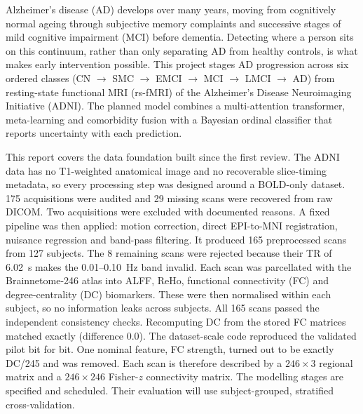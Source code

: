 \documentclass{ssnreview}
\begin{document}
\makereviewtitle
\reviewfrontmatter

\begin{reviewabstract}
Alzheimer's disease (AD) develops over many years, moving from cognitively
normal ageing through subjective memory complaints and successive stages of
mild cognitive impairment (MCI) before dementia. Detecting where a person sits
on this continuum, rather than only separating AD from healthy controls, is
what makes early intervention possible. This project stages AD progression
across six ordered classes (CN $\rightarrow$ SMC $\rightarrow$ EMCI
$\rightarrow$ MCI $\rightarrow$ LMCI $\rightarrow$ AD) from resting-state
functional MRI (rs-fMRI) of the Alzheimer's Disease Neuroimaging Initiative
(ADNI). The planned model combines a multi-attention transformer, meta-learning
and comorbidity fusion with a Bayesian ordinal classifier that reports
uncertainty with each prediction.

This report covers the data foundation built since the first review. The ADNI
data has no T1-weighted anatomical image and no recoverable slice-timing
metadata, so every processing step was designed around a BOLD-only dataset.
175 acquisitions were audited and 29 missing scans were recovered from raw
DICOM. Two acquisitions were excluded with documented reasons. A
fixed pipeline was then applied: motion correction, direct EPI-to-MNI
registration, nuisance regression and band-pass filtering. It produced 165
preprocessed scans from 127 subjects. The 8 remaining scans were rejected
because their TR of 6.02~s makes the 0.01--0.10~Hz band invalid. Each scan was
parcellated with the Brainnetome-246 atlas into ALFF, ReHo, functional
connectivity (FC) and degree-centrality (DC) biomarkers. These were then
normalised within each subject, so no information leaks across subjects. All 165
scans passed the independent consistency checks. Recomputing DC from the stored FC
matrices matched exactly (difference $0.0$). The dataset-scale code reproduced the
validated pilot bit for bit. One nominal feature, FC strength, turned out to be
exactly DC/245 and was removed. Each scan is therefore described by a
$246\times3$ regional matrix and a $246\times246$ Fisher-$z$ connectivity matrix.
The modelling stages are specified and scheduled. Their evaluation will use
subject-grouped, stratified cross-validation.

\end{reviewabstract}
\end{document}
